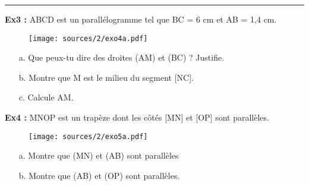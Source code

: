 \documentclass[11pt]{article}
\newcommand{\horrule}[1]{\rule{\linewidth}{#1}} %
\newcommand{\Pointille}[1][3]{\multido{}{#1}{ \makebox[\linewidth]{\dotfill}\\[\parskip]}}
\begin{document}
\horrule{1px}
\setlength{\columnseprule}{1pt}
\begin{multicols}{2}


\textbf{Ex3 :} ABCD est un parallélogramme tel que BC = 6 cm et AB = 1,4 cm.
  \begin{figure}[H]
    \centering
    \texttt{[image: sources/2/exo4a.pdf]}
  \end{figure}
  \begin{itemize}
  \item[a.] Que peux-tu dire des droites (AM) et (BC) ? Justifie. \newline
    \Pointille[3]
  \item[b.] Montre que M est le milieu du segment [NC]. \newline
    \Pointille[5]
  \item[c.] Calcule AM. \newline
    \Pointille[2] 
  \end{itemize}



\textbf{Ex4 :} MNOP est un trapèze dont les côtés [MN] et [OP] sont parallèles.
  \begin{figure}[H]
    \centering
    \texttt{[image: sources/2/exo5a.pdf]}
  \end{figure}
  \begin{itemize}
  \item[a.] Montre que (MN) et (AB) sont parallèles \newline
    \Pointille[7]
  \item[b.] Montre que (AB) et (OP) sont parallèles. \newline
    \Pointille[7]
  \end{itemize}

\end{multicols}
\end{document}
